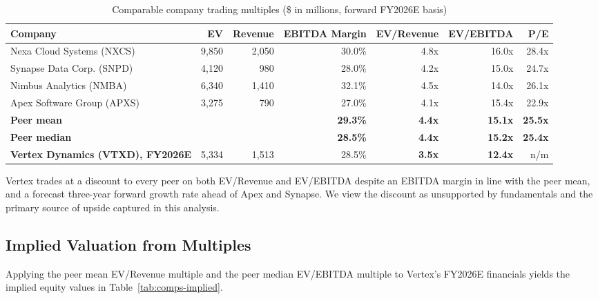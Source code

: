 \begin{table}[H]
\centering
\small
\caption{Comparable company trading multiples (\$ in millions, forward FY2026E basis)}
\label{tab:comps}
\begin{tabular}{@{}lrrrrrr@{}}
\toprule
\textbf{Company} & \textbf{EV} & \textbf{Revenue} & \textbf{EBITDA Margin} & \textbf{EV/Revenue} & \textbf{EV/EBITDA} & \textbf{P/E} \\
\midrule
Nexa Cloud Systems (NXCS) & 9,850 & 2,050 & 30.0\% & 4.8x & 16.0x & 28.4x \\
Synapse Data Corp. (SNPD) & 4,120 & 980 & 28.0\% & 4.2x & 15.0x & 24.7x \\
Nimbus Analytics (NMBA) & 6,340 & 1,410 & 32.1\% & 4.5x & 14.0x & 26.1x \\
Apex Software Group (APXS) & 3,275 & 790 & 27.0\% & 4.1x & 15.4x & 22.9x \\
\midrule
\textbf{Peer mean} & & & \textbf{29.3\%} & \textbf{4.4x} & \textbf{15.1x} & \textbf{25.5x} \\
\textbf{Peer median} & & & \textbf{28.5\%} & \textbf{4.4x} & \textbf{15.2x} & \textbf{25.4x} \\
\midrule
\textbf{Vertex Dynamics (VTXD), FY2026E} & 5,334 & 1,513 & 28.5\% & \textbf{3.5x} & \textbf{12.4x} & n/m \\
\bottomrule
\end{tabular}
\end{table}

Vertex trades at a discount to every peer on both EV/Revenue and EV/EBITDA despite an EBITDA margin in line with the peer mean, and a forecast three-year forward growth rate ahead of Apex and Synapse. We view the discount as unsupported by fundamentals and the primary source of upside captured in this analysis.

\subsection{Implied Valuation from Multiples}

Applying the peer mean EV/Revenue multiple and the peer median EV/EBITDA multiple to Vertex's FY2026E financials yields the implied equity values in Table~\ref{tab:comps-implied}.

